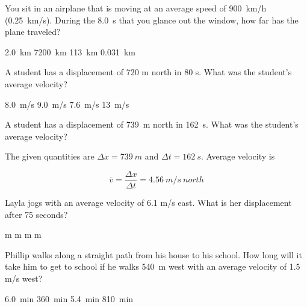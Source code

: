 \documentclass[]{exam}
\begin{document}
\begin{questions}
\begin{questions}
\question %
You sit in an airplane that is moving at an average speed of 
\SI{900}{km/h} (\SI{0.25}{km/s}). During the \SI{8.0}{s}
that you glance out the window, how far has the plane traveled?

\begin{choices}
\CorrectChoice \SI{2.0}{km}
\choice \SI{7200}{km}
\choice \SI{113}{km}
\choice \SI{0.031}{km}
\end{choices}


\clearpage

\question %
A student has a displacement of 720 m north in 80 s. What was the student's average velocity?

\begin{choices}
\choice \SI{8.0}{m/s}
\CorrectChoice \SI{9.0}{m/s}
\choice \SI{7.6}{m/s}
\choice \SI{13}{m/s}
\end{choices}


\question
A student has a displacement of \SI{739}{m} north in \SI{162}{s}. What was the student's average velocity?

\begin{solution}
    The given quantities are $\Delta{x} = \SI{739}{m}$ and $\Delta{t} = \SI{162}{s}$. Average velocity is

\begin{equation*}
        \bar{v} = \frac{\Delta{x}}{\Delta{t}} = \SI{4.56}{m/s\ north}
\end{equation*}
\end{solution}



\question %
Layla jogs with an average velocity of 6.1 m/s east. What is her displacement after 75 seconds?

\begin{choices}
 m
 m
 m
 m
\end{choices}


\question %
Phillip walks along a straight path from his house to his school. How long will it take him to get to school if he walks \SI{540}{m} west with an average velocity of 1.5 m/s west?

\begin{choices}
\CorrectChoice \SI{6.0}{min}
\choice \SI{360}{min}
\choice \SI{5.4}{min}
\choice \SI{810}{min}


\end{choices}


\end{questions}
\end{questions}
\end{document}
